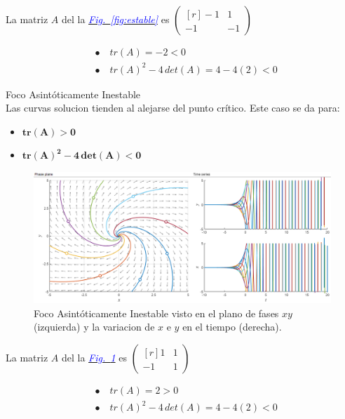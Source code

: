 \documentclass[12pt,a4paper]{report} %
\newcommand{\fref}[1]{\hyperref[#1]{\textcolor{blue}{\textit{Fig.~\ref*{#1}}}}}
\begin{document}
	La matriz $A$ del la \fref{fig:estable} es 
	$\begin{pmatrix*}[r]
		-1 & 1 \\
		-1 & -1
	\end{pmatrix*}$
	
	\begin{align*}
		&\bullet\quad tr(A)=-2<0 \\[2mm]
		&\bullet\quad tr(A)^2-4\,det(A)=4-4(2)<0
	\end{align*}
	
	\newpage
	
	{\Large\textbullet\quad Foco Asintóticamente Inestable}\\[0.5cm]
	
	Las curvas solucion tienden al alejarse del punto crítico. Este caso se da para: 
	\begin{itemize}
		\item $\bm{tr(A)>0}$
		\item $\bm{tr(A)^2-4\,det(A)<0}$
	\end{itemize}
	
	\begin{figure}[h]
		\centering
		\includegraphics[width=1\textwidth]{inestable.png}
		\caption{Foco Asintóticamente Inestable visto en el plano de fases $xy$ (izquierda) y la variacion de $x$ e $y$ en el tiempo (derecha).}
		\label{fig:inestable}
	\end{figure}\smallskip
	
	La matriz $A$ del la \fref{fig:inestable} es 
	 $\begin{pmatrix*}[r]
		 1 & 1 \\
		-1 & 1
	 \end{pmatrix*}$
	
	\begin{align*}
		&\bullet\quad tr(A)=2>0 \\[2mm]
		&\bullet\quad tr(A)^2-4\,det(A)=4-4(2)<0
	\end{align*}
	
\end{document}
